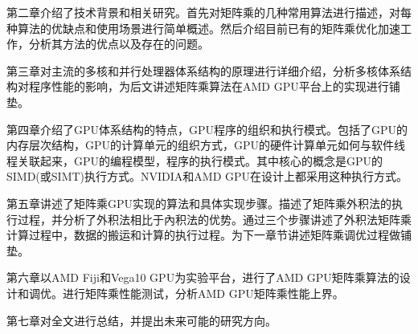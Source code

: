 第二章介绍了技术背景和相关研究。首先对矩阵乘的几种常用算法进行描述，对每种算法的优缺点和使用场景进行简单概述。然后介绍目前已有的矩阵乘优化加速工作，分析其方法的优点以及存在的问题。

第三章对主流的多核和并行处理器体系结构的原理进行详细介绍，分析多核体系结构对程序性能的影响，为后文讲述矩阵乘算法在AMD GPU平台上的实现进行铺垫。

第四章介绍了GPU体系结构的特点，GPU程序的组织和执行模式。包括了GPU的内存层次结构，GPU的计算单元的组织方式，GPU的硬件计算单元如何与软件线程关联起来，GPU的编程模型，程序的执行模式。其中核心的概念是GPU的SIMD(或SIMT)执行方式。NVIDIA和AMD GPU在设计上都采用这种执行方式。

第五章讲述了矩阵乘GPU实现的算法和具体实现步骤。描述了矩阵乘外积法的执行过程，并分析了外积法相比于內积法的优势。通过三个步骤讲述了外积法矩阵乘计算过程中，数据的搬运和计算的执行过程。为下一章节讲述矩阵乘调优过程做铺垫。

第六章以AMD Fiji和Vega10 GPU为实验平台，进行了AMD GPU矩阵乘算法的设计和调优。进行矩阵乘性能测试，分析AMD GPU矩阵乘性能上界。

第七章对全文进行总结，并提出未来可能的研究方向。



